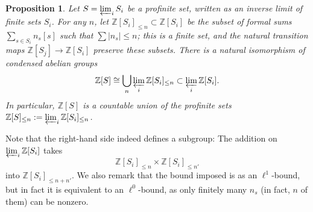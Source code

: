 \documentclass[11pt]{amsbook}
\numberwithin{equation}{section}
\numberwithin{theorem}{section}
\newtheorem{proposition}[theorem]{Proposition}
\theoremstyle{definition}
\begin{document}
\begin{proposition}\label{prop:freecondensedgroup} Let $S=\varprojlim_i S_i$ be a profinite set, written as an inverse limit of finite sets $S_i$. For any $n$, let $\mathbb Z[S_i]_{\leq n}\subset \mathbb Z[S_i]$ be the subset of formal sums $\sum_{s\in S_i} n_s [s]$ such that $\sum |n_s|\leq n$; this is a finite set, and the natural transition maps $\mathbb Z[S_j]\to \mathbb Z[S_i]$ preserve these subsets. There is a natural isomorphism of condensed abelian groups
\[
\mathbb Z[S]\cong \bigcup_n \varprojlim_i \mathbb Z[S_i]_{\leq n}\subset \varprojlim_i \mathbb Z[S_i] .
\]
In particular, $\mathbb Z[S]$ is a countable union of the profinite sets $\mathbb Z[S]_{\leq n} := \varprojlim_i \mathbb Z[S_i]_{\leq n}$.
\end{proposition}

Note that the right-hand side indeed defines a subgroup: The addition on $\varprojlim_i \mathbb Z[S_i]$ takes
\[
\mathbb Z[S_i]_{\leq n}\times \mathbb Z[S_i]_{\leq n'}
\]
into $\mathbb Z[S_i]_{\leq n+n'}$. We also remark that the bound imposed is as an $\ell^1$-bound, but in fact it is equivalent to an $\ell^0$-bound, as only finitely many $n_s$ (in fact, $n$ of them) can be nonzero.
\end{document}
